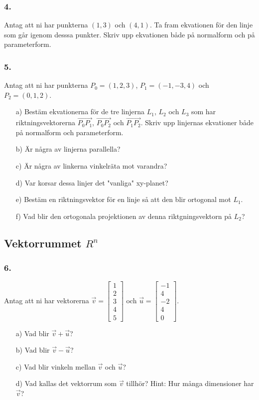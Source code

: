 \documentclass{article}
\begin{document}
\subsubsection*{4.}
Antag att ni har punkterna $(1,3)$ och $(4,1)$. Ta fram ekvationen för den linje som går igenom desssa punkter. Skriv upp ekvationen både på normalform och på parameterform.  

\subsubsection*{5.}
Antag att ni har punkterna $P_0 = (1,2,3)$, $P_1 = (-1,-3,4)$ och $P_2 = (0,1,2)$.
\begin{itemize}
\item[a) ] Bestäm ekvationerna för de tre linjerna $L_1$, $L_2$ och $L_3$ som har riktningsvektorerna $\vec{P_0 P_1}$, $\vec{P_0 P_2}$ och $\vec{P_1 P_2}$. Skriv upp linjernas ekvationer både på normalform och parameterform. 
\item[b) ] Är några av linjerna parallella?
\item[c) ] Är några av linkerna vinkelräta mot varandra?
\item[d) ] Var korsar dessa linjer det "vanliga" xy-planet?
\item[e) ] Bestäm en riktningsvektor för en linje så att den blir ortogonal mot $L_1$. 
\item[f) ] Vad blir den ortogonala projektionen av denna riktgningsvektorn på $L_2$?
\end{itemize}

\subsection*{Vektorrummet $R^n$}
\subsubsection*{6.}
Antag att ni har vektorerna $\vec{v}=\begin{bmatrix}1 \\ 2 \\ 3 \\ 4 \\ 5 \end{bmatrix}$ och $\vec{u}=\begin{bmatrix}-1 \\ 4 \\ -2 \\ 4 \\ 0 \end{bmatrix}$.
\begin{itemize}
\item[a) ] Vad blir $\vec{v}+\vec{u}$?
\item[b) ] Vad blir $\vec{v}-\vec{u}$?
\item[c) ] Vad blir vinkeln mellan $\vec{v}$ och $\vec{u}$?
\item[d) ] Vad kallas det vektorrum som $\vec{v}$ tillhör? Hint: Hur många dimensioner har $\vec{v}$? 
\end{itemize}
\end{document}
